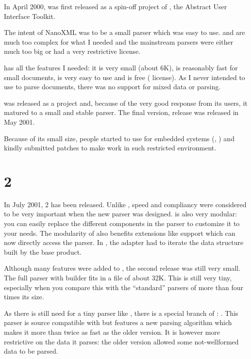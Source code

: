 In April 2000,  was first released as a spin-off project of
, the Abstract User Interface Toolkit.

The intent of NanoXML was to be a small parser which was easy to use.
 and  are much too complex for what I needed and the
mainstream parsers were either much too big or had a very restrictive license.

 has all the features I needed: it is very small (about 6K),
is reasonably fast for small  documents, is very easy to use and is
free ( license).
As I never intended to use  to parse  documents,
there was no support for mixed data or  parsing.

 was released as a  project and, because of the
very good response from its users, it matured to a small and stable parser.
The final version, release  was released in May 2001.

Because of its small size, people started to use  for embedded
systems (, ) and kindly submitted patches to make
 work in such restricted environment.

\section{ 2}

In July 2001,  2 has been released.
Unlike , speed and  compliancy were considered to be
very important when the new parser was designed.
 is also very modular: you can easily replace the different
components in the parser to customize it to your needs.
The modularity of  also benefits extensions like 
 support which can now directly access the parser.
In , the  adapter had to iterate the data structure
built by the base product.

Although many features were added to , the second release was
still very small.
The full parser with builder fits in a  file of about 32K.
This is still very tiny, especially when you compare this with the ``standard''
parsers of more than four times its size.

As there is still need for a tiny parser like , there is a
special branch of : . This parser is source
compatible with  but features a new parsing algorithm which
makes it more than twice as fast as the older version.
It is however more restrictive on the  data it parses: the older
version allowed some not-wellformed data to be parsed.

